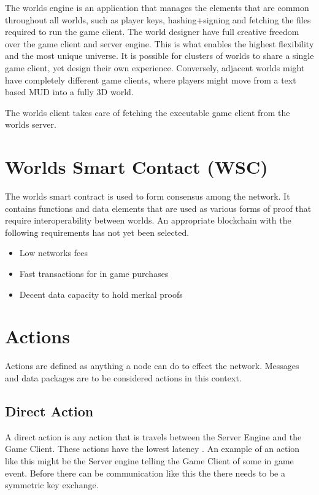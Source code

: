 \documentclass[runningheads,a4paper]{llncs}
\begin{document}
The worlds engine is an application that manages the elements that are common throughout all worlds, such as player keys, hashing+signing and fetching the files required to run the game client. The world designer have full creative freedom over the game client and server engine. This is what enables the highest flexibility and the most unique universe. It is possible for clusters of worlds to share a single game client, yet design their own experience. Conversely, adjacent worlds might have completely different game clients, where players might move from a text based MUD into a fully 3D world.

The worlds client takes care of fetching the executable game client from the worlds server.

\section{Worlds Smart Contact (WSC)}
\label{WSC}
The worlds smart contract is used to form consensus among the network. It contains functions and data elements that are used as various forms of proof that require interoperability between worlds. An appropriate blockchain with the following requirements has not yet been selected.

\begin{itemize}
\item{Low networks fees}
\item{Fast transactions for in game purchases}
\item{Decent data capacity to hold merkal proofs}
\end{itemize}

\section{Actions}
Actions are defined as anything a node can do to effect the network. Messages and data packages are to be considered actions in this context.

\subsection{Direct Action}
A direct action is any action that is travels between the Server Engine and the Game Client. These actions have the lowest latency . An example of an action like this might be the Server engine telling the Game Client of some in game event. Before there can be communication like this the there needs to be a symmetric key exchange. 
\end{document}

